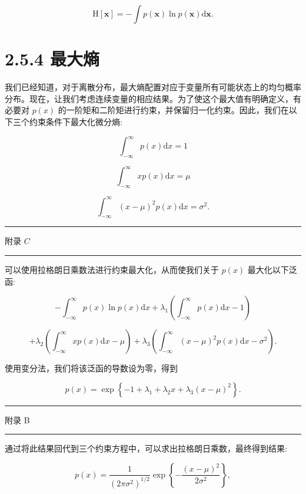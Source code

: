 \documentclass[10pt]{article}
\newcommand{\HRule}{\begin{center}\rule{0.9\linewidth}{0.2mm}\end{center}}
\begin{document}
\[
\mathrm{H}\left\lbrack  \mathbf{x}\right\rbrack   =  - \int p\left( \mathbf{x}\right) \ln p\left( \mathbf{x}\right) \mathrm{d}\mathbf{x}. \tag{2.92}
\]

\section*{2.5.4 最大熵}

我们已经知道，对于离散分布，最大熵配置对应于变量所有可能状态上的均匀概率分布。现在，让我们考虑连续变量的相应结果。为了使这个最大值有明确定义，有必要对 \(p\left( x\right)\) 的一阶矩和二阶矩进行约束，并保留归一化约束。因此，我们在以下三个约束条件下最大化微分熵:

\[
{\int }_{-\infty }^{\infty }p\left( x\right) \mathrm{d}x = 1 \tag{2.93}
\]

\[
{\int }_{-\infty }^{\infty }{xp}\left( x\right) \mathrm{d}x = \mu  \tag{2.94}
\]

\[
{\int }_{-\infty }^{\infty }{\left( x - \mu \right) }^{2}p\left( x\right) \mathrm{d}x = {\sigma }^{2}. \tag{2.95}
\]

\HRule

附录 \(C\)

\HRule

可以使用拉格朗日乘数法进行约束最大化，从而使我们关于 \(p\left( x\right)\) 最大化以下泛函:

\[
- {\int }_{-\infty }^{\infty }p\left( x\right) \ln p\left( x\right) \mathrm{d}x + {\lambda }_{1}\left( {{\int }_{-\infty }^{\infty }p\left( x\right) \mathrm{d}x - 1}\right)
\]

\[
+ {\lambda }_{2}\left( {{\int }_{-\infty }^{\infty }{xp}\left( x\right) \mathrm{d}x - \mu }\right)  + {\lambda }_{3}\left( {{\int }_{-\infty }^{\infty }{\left( x - \mu \right) }^{2}p\left( x\right) \mathrm{d}x - {\sigma }^{2}}\right) . \tag{2.96}
\]

使用变分法，我们将该泛函的导数设为零，得到

\[
p\left( x\right)  = \exp \left\{  {-1 + {\lambda }_{1} + {\lambda }_{2}x + {\lambda }_{3}{\left( x - \mu \right) }^{2}}\right\}  . \tag{2.97}
\]

\HRule

附录 B

\HRule

通过将此结果回代到三个约束方程中，可以求出拉格朗日乘数，最终得到结果:

\[
p\left( x\right)  = \frac{1}{{\left( 2\pi {\sigma }^{2}\right) }^{1/2}}\exp \left\{  {-\frac{{\left( x - \mu \right) }^{2}}{2{\sigma }^{2}}}\right\}  , \tag{2.98}
\]
\end{document}
